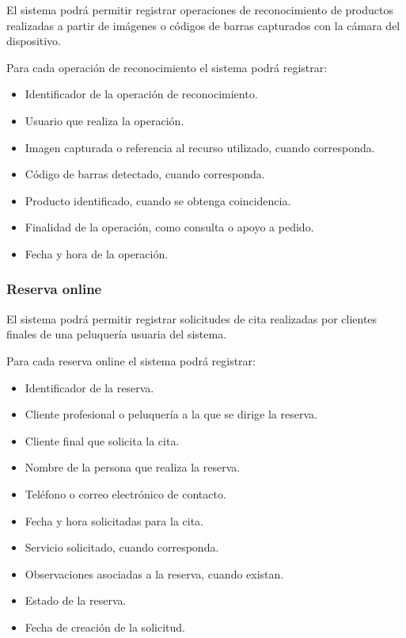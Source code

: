 El sistema podrá permitir registrar operaciones de reconocimiento de productos realizadas a partir de imágenes o códigos de barras capturados con la cámara del dispositivo.

Para cada operación de reconocimiento el sistema podrá registrar:

\begin{itemize}
    \item Identificador de la operación de reconocimiento.
    \item Usuario que realiza la operación.
    \item Imagen capturada o referencia al recurso utilizado, cuando corresponda.
    \item Código de barras detectado, cuando corresponda.
    \item Producto identificado, cuando se obtenga coincidencia.
    \item Finalidad de la operación, como consulta o apoyo a pedido.
    \item Fecha y hora de la operación.
\end{itemize}

\subsubsection*{Reserva online}

El sistema podrá permitir registrar solicitudes de cita realizadas por clientes finales de una peluquería usuaria del sistema.

Para cada reserva online el sistema podrá registrar:

\begin{itemize}
    \item Identificador de la reserva.
    \item Cliente profesional o peluquería a la que se dirige la reserva.
    \item Cliente final que solicita la cita.
    \item Nombre de la persona que realiza la reserva.
    \item Teléfono o correo electrónico de contacto.
    \item Fecha y hora solicitadas para la cita.
    \item Servicio solicitado, cuando corresponda.
    \item Observaciones asociadas a la reserva, cuando existan.
    \item Estado de la reserva.
    \item Fecha de creación de la solicitud.
\end{itemize}
